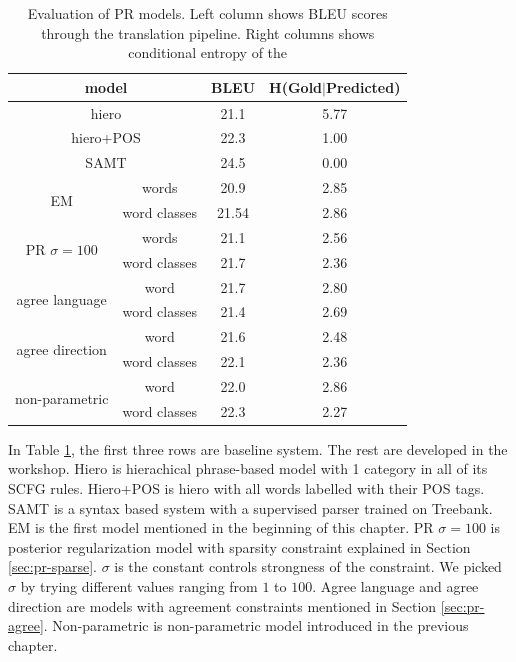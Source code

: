 \begin{table}[h]
  \centering
  \begin{tabular}{ |*{4}{c|} }
    \hline
    \multicolumn{2}{|c|}{model} & BLEU & H(Gold$|$Predicted)\\
    \hline
    \multicolumn{2}{|c|}{hiero} & 21.1 & 5.77\\
    \multicolumn{2}{|c|}{hiero+POS} & 22.3 & 1.00 \\
    \multicolumn{2}{|c|}{SAMT} & 24.5 & 0.00 \\
    \hline
	\multirow{2}{*}{EM} & words & 20.9 & 2.85 \\
	& word classes & 21.54 & 2.86 \\ \hline
    \multirow{2}{*}{PR $\sigma=100$}&words & 21.1 & 2.56 \\
	&word classes & 21.7 & 2.36 \\ \hline
    \multirow{2}{*}{agree language}&word & 21.7 & 2.80 \\
	&word classes & 21.4 & 2.69\\ \hline
    \multirow{2}{*}{agree direction}&word & 21.6 & 2.48\\
	&word classes &22.1 &2.36 \\ \hline
   \multirow{2}{*}{non-parametric}&word & 22.0 & 2.86\\
	& word classes&22.3&2.27\\ 
    \hline
  \end{tabular}
    \caption
  {Evaluation of PR models.
	Left column shows BLEU scores
	through the translation pipeline.
	Right columns shows conditional entropy
	of the 
    }
  \label{tab:results}
\end{table}

In Table \ref{tab:results}, the first three rows
are baseline system. The rest are developed in the workshop.
Hiero is hierachical phrase-based
model with 1 category in all of its SCFG rules. Hiero+POS
is hiero with all words labelled with their POS tags.
SAMT is a syntax based system with a supervised
parser trained on Treebank. EM is the first model mentioned
in the beginning of this chapter. PR $\sigma=100$ is 
posterior regularization model with sparsity constraint
explained in Section \ref{sec:pr-sparse}.
$\sigma$ is the constant controls strongness of the constraint.
We picked $\sigma$ by trying different values ranging from 
$1$ to $100$.
Agree language and agree direction are models with agreement 
constraints mentioned in Section \ref{sec:pr-agree}. Non-parametric
is non-parametric model introduced in the previous chapter.
